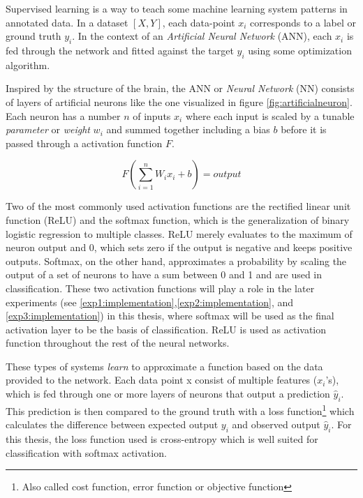 Supervised learning is a way to teach some machine learning system patterns in annotated data. In a dataset \(\left [X, Y \right] \), each data-point \(x_{i}\) corresponds to a label or ground truth \(y_{i}\). In the context of an \textit{Artificial Neural Network} (ANN), each \(x_{i}\) is fed through the network and fitted against the target \(y_{i}\) using some optimization algorithm. 

Inspired by the structure of the brain, the ANN or \textit{Neural Network} (NN) consists of layers of artificial neurons like the one visualized in figure \ref{fig:artificialneuron}. Each neuron has a number \(n\) of inputs \(x_{i}\) where each input is scaled by a tunable \textit{parameter} or \textit{weight} \(w_{i}\) and summed together including a bias \(b\) before it is passed through a activation function \(F\).

\begin{equation}
    F(\sum_{i=1}^{n}W_{i}x_{i} + b) = output
\end{equation}

Two of the most commonly used activation functions are the rectified linear unit function (ReLU) and the softmax function, which is the generalization of binary logistic regression to multiple classes. ReLU merely evaluates to the maximum of neuron output and 0, which sets zero if the output is negative and keeps positive outputs. Softmax, on the other hand, approximates a probability by scaling the output of a set of neurons to have a sum between 0 and 1 and are used in classification. These two activation functions will play a role in the later experiments (see \ref{exp1:implementation},\ref{exp2:implementation}, and \ref{exp3:implementation}) in this thesis, where softmax will be used as the final activation layer to be the basis of classification. ReLU is used as activation function throughout the rest of the neural networks. 

These types of systems \textit{learn} to approximate a function based on the data provided to the network. Each data point x consist of multiple features (\(x_{i}\)'s), which is fed through one or more layers of neurons that output a prediction \(\hat{y}_{i}\). This prediction is then compared to the ground truth with a loss function\footnote{Also called cost function, error function or objective function} which calculates the difference between expected output \(y_{i}\) and observed output \(\hat{y}_{i}\).
For this thesis, the loss function used is cross-entropy which is well suited for classification with softmax activation\cite{softmaxcrossentropy}.

